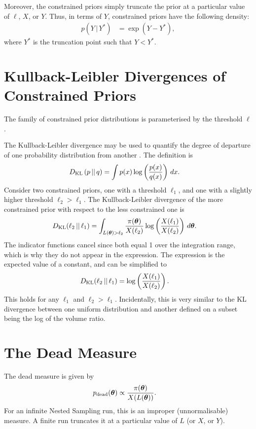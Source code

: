 \documentclass[entropy,article,submit,pdftex,moreauthors]{Definitions/mdpi}
\newcommand{\thresh}{\ell}
\newcommand{\coord}{\boldsymbol{\theta}}
\newcommand{\given}{\,|\,}
\begin{document}
Moreover, the constrained priors simply truncate the prior at a particular
value of $\thresh$, $X$, or $Y$. Thus, in terms of $Y$, constrained priors have
the following density:
\begin{align}
p\left(Y \given Y^*\right) &= \exp\left(Y - Y^*\right),
\end{align}
where $Y^*$ is the truncation point such that $Y < Y^*$.



\section{Kullback-Leibler Divergences of Constrained Priors}
The family of constrained prior distributions is parameterised by the
threshold $\thresh$.

The Kullback-Leibler divergence may be used to quantify the degree of
departure of one probability distribution from another
\citep{knuth2012foundations}. The definition is
\begin{align}
D_{\rm KL}\left(p \,||\, q\right)
    &= \int p(x)\log\left(\frac{p(x)}{q(x)}\right) \, dx.
\end{align}
Consider two constrained priors, one with a threshold $\thresh_1$, and one
with a slightly higher threshold $\thresh_2 > \thresh_1$.
The Kullback-Leibler divergence of the more constrained prior with
respect to the less constrained one is
\begin{align}
D_{\rm KL}(\thresh_2 \,||\, \thresh_1)
    &= \int_{L(\coord) > \thresh_2}
                \frac{\pi(\coord)}{X(\thresh_2)}
                \log\left(\frac{X(\thresh_1)}{X(\thresh_2)}\right)
                \, d\coord.
\end{align}
The indicator functions cancel since both equal 1 over the integration
range, which is why they do not appear in the expression.
The expression is the expected value of a constant, and can be simplified
to
\begin{align}
D_{\rm KL}(\thresh_2 \,||\, \thresh_1)
    &= \log\left(\frac{X(\thresh_1)}{X(\thresh_2)}\right).
\end{align}
This holds for any $\thresh_1$ and $\thresh_2 > \thresh_1$.
Incidentally, this is very similar to the KL divergence between
one uniform distribution and another defined on a subset
being the log of the volume ratio.

\section{The Dead Measure}
The dead measure is given by
\begin{align}
p_{\rm dead}(\coord) &\propto \frac{\pi(\coord)}{X(L(\coord))}.
\end{align}
For an infinite Nested Sampling run, this is an improper (unnormalisable)
measure. A finite run truncates it at a particular value of $L$
(or $X$, or $Y$).
\end{document}
